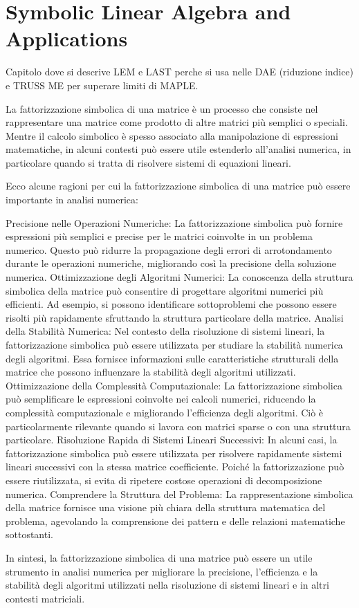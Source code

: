 
\chapter{Symbolic Linear Algebra and Applications}
\label{chapter:symbolic_linear_algebra}


Capitolo dove si descrive LEM e LAST perche si usa nelle DAE (riduzione indice) e TRUSS ME per superare limiti di MAPLE.

La fattorizzazione simbolica di una matrice è un processo che consiste nel rappresentare una matrice come prodotto di altre matrici più semplici o speciali. Mentre il calcolo simbolico è spesso associato alla manipolazione di espressioni matematiche, in alcuni contesti può essere utile estenderlo all'analisi numerica, in particolare quando si tratta di risolvere sistemi di equazioni lineari.

Ecco alcune ragioni per cui la fattorizzazione simbolica di una matrice può essere importante in analisi numerica:

Precisione nelle Operazioni Numeriche:
La fattorizzazione simbolica può fornire espressioni più semplici e precise per le matrici coinvolte in un problema numerico. Questo può ridurre la propagazione degli errori di arrotondamento durante le operazioni numeriche, migliorando così la precisione della soluzione numerica.
Ottimizzazione degli Algoritmi Numerici:
La conoscenza della struttura simbolica della matrice può consentire di progettare algoritmi numerici più efficienti. Ad esempio, si possono identificare sottoproblemi che possono essere risolti più rapidamente sfruttando la struttura particolare della matrice.
Analisi della Stabilità Numerica:
Nel contesto della risoluzione di sistemi lineari, la fattorizzazione simbolica può essere utilizzata per studiare la stabilità numerica degli algoritmi. Essa fornisce informazioni sulle caratteristiche strutturali della matrice che possono influenzare la stabilità degli algoritmi utilizzati.
Ottimizzazione della Complessità Computazionale:
La fattorizzazione simbolica può semplificare le espressioni coinvolte nei calcoli numerici, riducendo la complessità computazionale e migliorando l'efficienza degli algoritmi. Ciò è particolarmente rilevante quando si lavora con matrici sparse o con una struttura particolare.
Risoluzione Rapida di Sistemi Lineari Successivi:
In alcuni casi, la fattorizzazione simbolica può essere utilizzata per risolvere rapidamente sistemi lineari successivi con la stessa matrice coefficiente. Poiché la fattorizzazione può essere riutilizzata, si evita di ripetere costose operazioni di decomposizione numerica.
Comprendere la Struttura del Problema:
La rappresentazione simbolica della matrice fornisce una visione più chiara della struttura matematica del problema, agevolando la comprensione dei pattern e delle relazioni matematiche sottostanti.

In sintesi, la fattorizzazione simbolica di una matrice può essere un utile strumento in analisi numerica per migliorare la precisione, l'efficienza e la stabilità degli algoritmi utilizzati nella risoluzione di sistemi lineari e in altri contesti matriciali.
